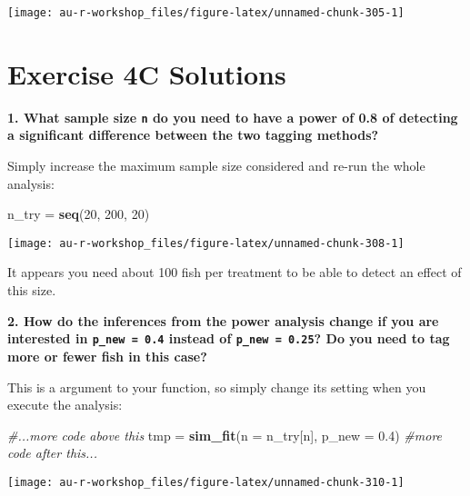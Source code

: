 \documentclass[]{book}
\newenvironment{Shaded}{\begin{snugshade}}{\end{snugshade}}
\newcommand{\KeywordTok}[1]{\textcolor[rgb]{0.13,0.29,0.53}{\textbf{#1}}}
\newcommand{\DataTypeTok}[1]{\textcolor[rgb]{0.13,0.29,0.53}{#1}}
\newcommand{\DecValTok}[1]{\textcolor[rgb]{0.00,0.00,0.81}{#1}}
\newcommand{\FloatTok}[1]{\textcolor[rgb]{0.00,0.00,0.81}{#1}}
\newcommand{\StringTok}[1]{\textcolor[rgb]{0.31,0.60,0.02}{#1}}
\newcommand{\CommentTok}[1]{\textcolor[rgb]{0.56,0.35,0.01}{\textit{#1}}}
\newcommand{\NormalTok}[1]{#1}
\theoremstyle{definition}
\theoremstyle{definition}
\theoremstyle{definition}
\theoremstyle{remark}
\begin{document}
\begin{center}\texttt{[image: au-r-workshop\_files/figure-latex/unnamed-chunk-305-1]} \end{center}

\hypertarget{ex4c-answers}{\section*{Exercise 4C
Solutions}\label{ex4c-answers}}

\textbf{1. What sample size \texttt{n} do you need to have a power of
0.8 of detecting a significant difference between the two tagging
methods?}

Simply increase the maximum sample size considered and re-run the whole
analysis:

\begin{Shaded}
\begin{Highlighting}[]
\NormalTok{n_try =}\StringTok{ }\KeywordTok{seq}\NormalTok{(}\DecValTok{20}\NormalTok{, }\DecValTok{200}\NormalTok{, }\DecValTok{20}\NormalTok{)}
\end{Highlighting}
\end{Shaded}

\begin{center}\texttt{[image: au-r-workshop\_files/figure-latex/unnamed-chunk-308-1]} \end{center}

It appears you need about 100 fish per treatment to be able to detect an
effect of this size.

\textbf{2. How do the inferences from the power analysis change if you
are interested in \texttt{p\_new\ =\ 0.4} instead of
\texttt{p\_new\ =\ 0.25}? Do you need to tag more or fewer fish in this
case?}

This is a argument to your function, so simply change its setting when
you execute the analysis:

\begin{Shaded}
\begin{Highlighting}[]
\CommentTok{#...more code above this}
\NormalTok{tmp =}\StringTok{ }\KeywordTok{sim_fit}\NormalTok{(}\DataTypeTok{n =}\NormalTok{ n_try[n], }\DataTypeTok{p_new =} \FloatTok{0.4}\NormalTok{)}
\CommentTok{#more code after this...}
\end{Highlighting}
\end{Shaded}

\begin{center}\texttt{[image: au-r-workshop\_files/figure-latex/unnamed-chunk-310-1]} \end{center}
\end{document}
